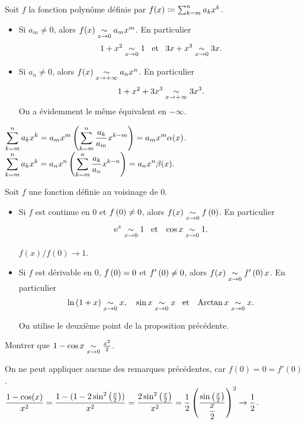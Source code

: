 \documentclass{magnoliaold}
\begin{document}
\begin{remarques}
\remarque Soit $f$ la fonction polynôme définie par $f(x)\coloneqq\sum_{k=m}^n a_k x^k$.
  \begin{itemize}
  \item Si $a_m \neq 0$, alors
    $f(x) \underset{x\rightarrow 0}{\sim} a_m x^m$.
    En particulier \[1+x^2\underset{x\rightarrow 0}{\sim}1 \quad\!\text{et}\quad\! 3x+x^3\underset{x\rightarrow 0}{\sim}3x.\]
  \item Si $a_n \neq 0$, alors $f(x) \underset{x\rightarrow +\infty}{\sim} a_n x^n$.
    En particulier \[1+x^2+3x^3\underset{x\rightarrow +\infty}{\sim}3x^3.\]
    On a évidemment le même équivalent en $-\infty$.
  \end{itemize}
  \begin{sol}
  $\displaystyle \sum_{k=m}^n a_k x^k=a_mx^m\left(\sum_{k=m}^n \dfrac{a_k}{a_m} x^{k-m}\right)=a_mx^m\alpha(x)$.\\
  $\displaystyle \sum_{k=m}^n a_k x^k=a_nx^n\left(\sum_{k=m}^n \dfrac{a_k}{a_n} x^{k-n}\right)=a_nx^n\beta(x).$
  
  \end{sol}
\remarque Soit $f$ une fonction définie au voisinage de 0.
  \begin{itemize}
  \item Si $f$ est continue en 0 et $f\left(0\right)\neq 0$, alors
    $f(x)\underset{x\rightarrow 0}{\sim}f\left(0\right)$.
    En particulier \[{\rm e}^x\underset{x\rightarrow 0}{\sim}1 \quad\!\text{et}\quad\! \cos x\underset{x\rightarrow 0}{\sim}1.\]
    \begin{sol}
    $f(x)/f(0)\to 1$.
    \end{sol}
  \item Si $f$ est dérivable en 0, $f\left(0\right)=0$ et $f'\left(0\right)\neq 0$, alors
    $f(x)\underset{x\rightarrow 0}{\sim}f'\left(0\right)x$. En particulier
    \[\ln\left(1+x\right)\underset{x\rightarrow 0}{\sim}x, \quad \sin x\underset{x\rightarrow 0}{\sim} x \quad\!\text{et}\quad\!
      \operatorname{Arctan} x \underset{x\rightarrow 0}{\sim}x.\]
      \begin{sol}
      On utilise le deuxième point de la proposition précédente.
      \end{sol}
  \end{itemize}
\end{remarques}

\begin{exoUnique}
\exo Montrer que $1-\cos x\underset{x\rightarrow 0}{\sim}\frac{x^2}{2}$.
\end{exoUnique}

\begin{sol}
On ne peut appliquer aucune des remarques précédentes, car $f(0)=0=f'(0)$.\\
$\dfrac{1-\cos(x)}{x^2}=\dfrac{1-(1-2\sin^2\left(\frac{x}{2}\right))}{x^2}=\dfrac{2\sin^2\left(\frac{x}{2}\right)}{x^2}=\dfrac{1}{2}\left(\dfrac{\sin\left(\frac{x}{2}\right)}{\dfrac{x}{2}}\right)^2\to \dfrac{1}{2}$.
\end{sol}
\end{document}
